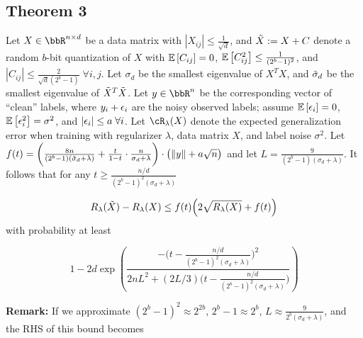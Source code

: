 \documentclass[12pt]{article}
\begin{document}
%		

\subsection{Theorem 3}
\begin{theorem}
	Let $X\in \RR^{n\times d}$ be a data matrix with $|X_{ij}| \leq \frac{1}{\sqrt{d}}$, and $\tX\defeq X+C$ denote a random $b$-bit quantization of $X$ with $\expect{}{C_{ij}}=0$, $\expect{}{C_{ij}^2} \leq \frac{1}{(2^b-1)^2}$, and $|C_{ij}| \leq \frac{2}{\sqrt{d}(2^b-1)} \; \forall i,j$.  
	Let $\sigma_d$ be the smallest eigenvalue of $X^T X$, and $\tsigma_d$ be the smallest eigenvalue of $\tX^T \tX$.
	Let $y \in \RR^n$ be the corresponding vector of ``clean'' labels, where $y_i + \eps_i$ are the noisy observed labels; assume $\expect{}{\eps_i} = 0$, $\expect{}{\eps_i^2} = \sigma^2$, and $|\eps_i| \leq a \; \forall i$.  Let $\cR_{\lambda}(X)$ denote the expected generalization error when training with regularizer $\lambda$, data matrix $X$, and label noise $\sigma^2$.  Let $f(t) = \bigg(\frac{8n}{(2^b-1)(\tsigma_d + \lambda)} +\frac{t}{1-t}\cdot \frac{n}{\sigma_d+\lambda}\bigg)\cdot \big(\|y\| + a\sqrt{n}\big)$ and let $L = \frac{9}{(2^b-1)(\sigma_d + \lambda)}$.  It follows that for any $t\geq \frac{n/d}{(2^b-1)^2(\sigma_d + \lambda)}$
	
	$$R_{\lambda}(\tX) - R_{\lambda}(X) \leq f(t)\Big(2\sqrt{R_{\lambda}(X)}+f(t)\Big)$$
	with probability at least 
	
	$$1 - 2d \exp \left(\frac{-\Big(t-\frac{n/d}{(2^b-1)^2(\sigma_d + \lambda)}\Big)^2}{2nL^2 + (2L/3)\Big(t-\frac{n/d}{(2^b-1)^2(\sigma_d + \lambda)}\Big)} \right)$$
\end{theorem}
\noindent\textbf{Remark:} If we approximate $(2^b-1)^2 \approx 2^{2b}$, $2^b-1\approx 2^b$, $L \approx \frac{9}{2^b(\sigma_d + \lambda)}$, and the RHS of this bound becomes
\end{document}
